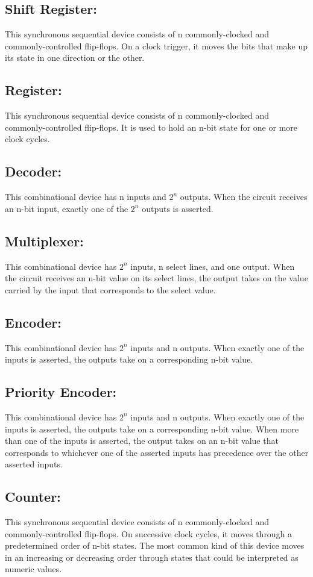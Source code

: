 \documentclass{article}
\begin{document}
\subsection*{Shift Register:} This synchronous sequential device consists of n commonly-clocked and commonly-controlled flip-flops. On a clock trigger, it moves the bits that make up its state in one direction or the other.
\subsection*{Register:} This synchronous sequential device consists of n commonly-clocked and commonly-controlled flip-flops. It is used to hold an n-bit state for one or more clock cycles.
\subsection*{Decoder:} This combinational device has n inputs and $2^n$ outputs. When the circuit receives an n-bit input, exactly one of the $2^n$ outputs is asserted.
\subsection*{Multiplexer:} This combinational device has $2^n$ inputs, n select lines, and one output. When the circuit receives an  n-bit  value  on  its  select  lines,  the  output  takes  on  the  value  carried  by  the input that corresponds to the select value.
\subsection*{Encoder:} This combinational device has $2^n$ inputs and n outputs. When exactly one of the inputs is asserted, the outputs take on a corresponding n-bit value.
\subsection*{Priority Encoder:} This combinational device has $2^n$ inputs and n outputs. When exactly one of the inputs is asserted, the outputs take on a corresponding n-bit value. When more than one of the inputs is asserted, the output takes on an n-bit value that corresponds to whichever one of the asserted inputs has precedence over the other asserted inputs.
\subsection*{Counter:} This synchronous sequential device consists of n commonly-clocked  and  commonly-controlled flip-flops. On successive clock cycles, it moves through a predetermined order of n-bit states. The most common kind of this device moves in an increasing or decreasing order through states that could be interpreted as numeric values.
\newpage
\end{document}
